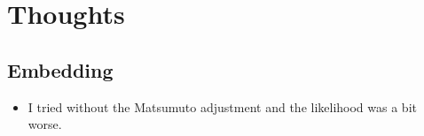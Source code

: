 \documentclass[11pt, twocolumn]{article}
\begin{document}
%
%

\nocite{*}



\clearpage
\section{Thoughts}
\subsection{Embedding}
\begin{itemize}
\item I tried without the Matsumuto adjustment and the likelihood was a bit worse.
\end{itemize}
\end{document}
